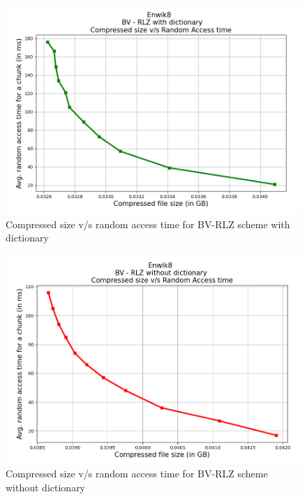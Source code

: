 \begin{figure}[H]
    \centering
    \includegraphics[width=\textwidth/2]{Figs/Enwik8_BV_RLZ_dict.png}
    \caption{Compressed size v/s random access time for BV-RLZ scheme with dictionary}
    \label{fig:enwik8_bv_rlz_dict}
\end{figure}


\begin{figure}[H]
    \centering
    \includegraphics[width=\textwidth/2]{Figs/Enwik8_BV_RLZ_nodict.png}
    \caption{Compressed size v/s random access time for BV-RLZ scheme without dictionary}
    \label{fig:enwik8_bv_rlz_nodict}
\end{figure}


